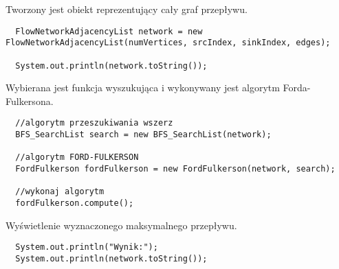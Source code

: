 \documentclass[10pt]{minutes}
\begin{document}
Tworzony jest obiekt reprezentujący cały graf przepływu.
\begin{lstlisting}      
  FlowNetworkAdjacencyList network = new FlowNetworkAdjacencyList(numVertices, srcIndex, sinkIndex, edges);  
        
  System.out.println(network.toString());
\end{lstlisting}

Wybierana jest funkcja wyszukująca i wykonywany jest algorytm Forda-Fulkersona.
\begin{lstlisting}
  //algorytm przeszukiwania wszerz
  BFS_SearchList search = new BFS_SearchList(network);

  //algorytm FORD-FULKERSON
  FordFulkerson fordFulkerson = new FordFulkerson(network, search);

  //wykonaj algorytm
  fordFulkerson.compute();
\end{lstlisting}

Wyświetlenie wyznaczonego maksymalnego przepływu.
\begin{lstlisting}        
  System.out.println("Wynik:");
  System.out.println(network.toString());
\end{lstlisting}
       
\end{document}
